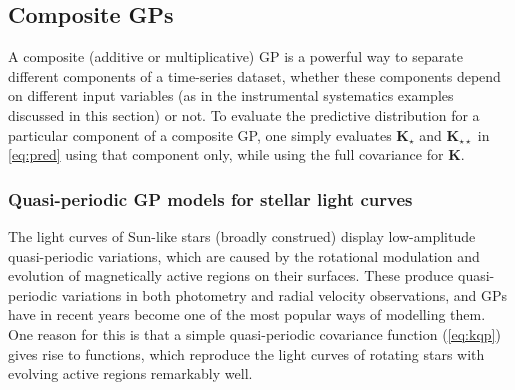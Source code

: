 \documentclass[letterpaper]{ar-1col}
\newcommand{\suz}[1]{\textcolor{magenta}{#1}}
\begin{document}
\begin{textbox}[ht]
\section{Composite GPs}
A composite (additive or multiplicative) GP is a powerful way to separate different components of a time-series dataset, whether these components depend on different input variables (as in the instrumental systematics examples discussed in this section) or not. To evaluate the predictive distribution for a particular component of a composite GP, one simply evaluates $\mathbf{K}_\star$ and $\mathbf{K}_{\star\star}$ in \autoref{eq:pred} using that component only, while using the full covariance for $\mathbf{K}$.
\end{textbox}

\subsubsection{Quasi-periodic GP models for stellar light curves}

The light curves of Sun-like stars (broadly construed) display low-amplitude quasi-periodic variations, which are caused by the rotational modulation and evolution of magnetically active regions on their surfaces. These produce quasi-periodic variations in both photometry and radial velocity observations, and GPs have in recent years become one of the most popular ways of modelling them. One reason for this is that a simple quasi-periodic covariance function (\autoref{eq:kqp}) gives rise to functions, which reproduce the light curves of rotating stars with evolving active regions remarkably well.

\end{document}
